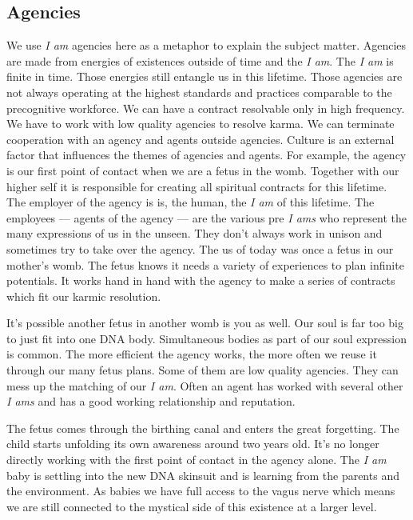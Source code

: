 \subsection{Agencies}\label{agencies}

We use \emph{I am} agencies here as a metaphor to explain the subject
matter. Agencies are made from energies of existences outside of time
and the \emph{I am}. The \emph{I am} is finite in time. Those energies
still entangle us in this lifetime. Those agencies are not always
operating at the highest standards and practices comparable to the
precognitive workforce. We can have a contract resolvable only in high
frequency. We have to work with low quality agencies to resolve karma.
We can terminate cooperation with an agency and agents outside agencies.
Culture is an external factor that influences the themes of agencies and
agents. For example, the agency is our first point of contact when we
are a fetus in the womb. Together with our higher self it is responsible
for creating all spiritual contracts for this lifetime. The employer of
the agency is is, the human, the \emph{I am} of this lifetime. The
employees --- agents of the agency --- are the various pre \emph{I ams}
who represent the many expressions of us in the unseen. They don't
always work in unison and sometimes try to take over the agency. The us
of today was once a fetus in our mother's womb. The fetus knows it needs
a variety of experiences to plan infinite potentials. It works hand in
hand with the agency to make a series of contracts which fit our karmic
resolution.

It's possible another fetus in another womb is you as well. Our soul is
far too big to just fit into one DNA body. Simultaneous bodies as part
of our soul expression is common. The more efficient the agency works,
the more often we reuse it through our many fetus plans. Some of them
are low quality agencies. They can mess up the matching of our \emph{I
am}. Often an agent has worked with several other \emph{I ams} and has a
good working relationship and reputation.

The fetus comes through the birthing canal and enters the great
forgetting. The child starts unfolding its own awareness around two
years old. It's no longer directly working with the first point of
contact in the agency alone. The \emph{I am} baby is settling into the
new DNA skinsuit and is learning from the parents and the environment.
As babies we have full access to the vagus nerve which means we are
still connected to the mystical side of this existence at a larger
level.

